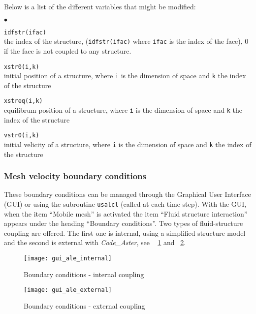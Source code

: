 {{{Below is a list of the different variables that might be modified:

\begin{list}{$\bullet$}{}

\item{\texttt{idfstr(ifac)}} \\
{the index of the structure, (\texttt{idfstr(ifac)} where \texttt{ifac} is the index of the face), 0 if the face is not coupled to any structure.}

\item{\texttt{xstr0(i,k)}} \\
{initial position of a structure, where \texttt{i} is the dimension of space
and \texttt{k} the index of the structure}

\item{\texttt{xstreq(i,k)}} \\
{equilibrum position of a structure, where \texttt{i} is the dimension of space
and \texttt{k} the index of the structure}

\item{\texttt{vstr0(i,k)}} \\
{initial velicity of a structure, where \texttt{i} is the dimension of space
and \texttt{k} the index of the structure }
\end{list}

\subsubsection{Mesh velocity boundary conditions}
These boundary conditions can be managed through the Graphical User Interface (GUI)
 or using the subroutine \texttt{usalcl} (called at each time step). With the GUI,
 when the item ``Mobile mesh'' is activated  the item ``Fluid structure interaction''
 appears under the heading ``Boundary conditions''. Two types of fluid-structure
 coupling are offered. The first one is internal, using a simplified structure
 model and the second is external with \textit{Code\_Aster}, see \figurename~
 \ref{fig:CL-ale1} and \figurename~\ref{fig:CL-ale2}.
%
\begin{figure}[ht]
\begin{center}
\texttt{[image: gui\_ale\_internal]}
\caption{Boundary conditions - internal coupling}
\label{fig:CL-ale1}
\end{center}
\end{figure}
%
\begin{figure}[ht]
\begin{center}
\texttt{[image: gui\_ale\_external]}
\caption{Boundary conditions - external coupling}
\label{fig:CL-ale2}
\end{center}
\end{figure}

}}}
